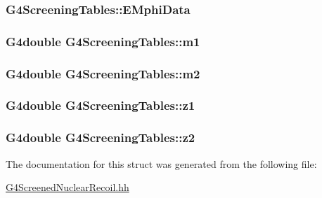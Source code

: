 \subsubsection[{\texorpdfstring{E\+Mphi\+Data}{EMphiData}}]{ G4\+Screening\+Tables\+::\+E\+Mphi\+Data}\hypertarget{structG4ScreeningTables_a79e3cd8918c5e27e1f15e43ac0f42a5b}{}\label{structG4ScreeningTables_a79e3cd8918c5e27e1f15e43ac0f42a5b}
\subsubsection[{\texorpdfstring{m1}{m1}}]{\setlength{\rightskip}{0pt plus 5cm}G4double G4\+Screening\+Tables\+::m1}\hypertarget{structG4ScreeningTables_a37e3971aed34265cd4934f36c11691f3}{}\label{structG4ScreeningTables_a37e3971aed34265cd4934f36c11691f3}
\subsubsection[{\texorpdfstring{m2}{m2}}]{\setlength{\rightskip}{0pt plus 5cm}G4double G4\+Screening\+Tables\+::m2}\hypertarget{structG4ScreeningTables_a174aca594aef6e3106d5c372f40e0d84}{}\label{structG4ScreeningTables_a174aca594aef6e3106d5c372f40e0d84}
\subsubsection[{\texorpdfstring{z1}{z1}}]{\setlength{\rightskip}{0pt plus 5cm}G4double G4\+Screening\+Tables\+::z1}\hypertarget{structG4ScreeningTables_a3cd98934fae4a889ab4e53f3864cc780}{}\label{structG4ScreeningTables_a3cd98934fae4a889ab4e53f3864cc780}
\subsubsection[{\texorpdfstring{z2}{z2}}]{\setlength{\rightskip}{0pt plus 5cm}G4double G4\+Screening\+Tables\+::z2}\hypertarget{structG4ScreeningTables_a4284a519e4baf655b8d90447fcda3121}{}\label{structG4ScreeningTables_a4284a519e4baf655b8d90447fcda3121}


The documentation for this struct was generated from the following file\+:\begin{DoxyCompactItemize}
\item 
\hyperlink{G4ScreenedNuclearRecoil_8hh}{G4\+Screened\+Nuclear\+Recoil.\+hh}\end{DoxyCompactItemize}
